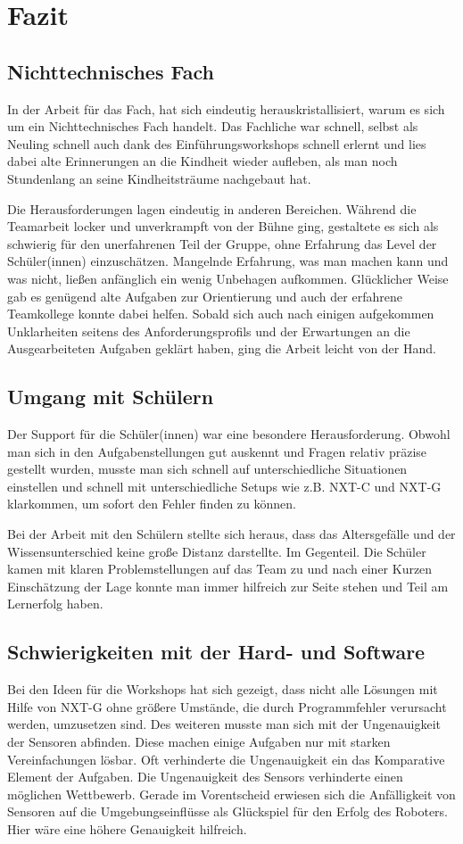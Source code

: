 \chapter{Fazit}
\section{Nichttechnisches Fach}
In der Arbeit für das Fach, hat sich eindeutig herauskristallisiert, warum es sich um ein Nichttechnisches Fach handelt. Das Fachliche war schnell, selbst als Neuling schnell auch dank des Einführungsworkshops schnell erlernt und lies dabei alte Erinnerungen an die Kindheit wieder aufleben, als man noch Stundenlang an seine Kindheitsträume nachgebaut hat.

Die Herausforderungen lagen eindeutig in anderen Bereichen. Während die Teamarbeit locker und unverkrampft von der Bühne ging, gestaltete es sich als schwierig für den unerfahrenen Teil der Gruppe, ohne Erfahrung das Level der Schüler(innen) einzuschätzen. Mangelnde Erfahrung, was man machen kann und was nicht, ließen anfänglich ein wenig Unbehagen aufkommen. Glücklicher Weise gab es genügend alte Aufgaben zur Orientierung und auch der erfahrene Teamkollege konnte dabei helfen. Sobald sich auch nach einigen aufgekommen Unklarheiten seitens des Anforderungsprofils und der Erwartungen an die Ausgearbeiteten Aufgaben geklärt haben, ging die Arbeit leicht von der Hand. 
    
\section{Umgang mit Schülern}
Der Support für die Schüler(innen) war eine besondere Herausforderung. Obwohl man sich in den Aufgabenstellungen gut auskennt und Fragen relativ präzise gestellt wurden, musste man sich schnell auf unterschiedliche Situationen einstellen und schnell mit unterschiedliche Setups wie z.B. NXT-C und NXT-G klarkommen, um sofort den Fehler finden zu können.

Bei der Arbeit mit den Schülern stellte sich heraus, dass das Altersgefälle und der Wissensunterschied keine große Distanz darstellte. Im Gegenteil. Die Schüler kamen mit klaren Problemstellungen auf das Team zu und nach einer Kurzen Einschätzung der Lage konnte man immer hilfreich zur Seite stehen und Teil am Lernerfolg haben.
  
\section{Schwierigkeiten mit der Hard- und Software}
Bei den Ideen für die Workshops hat sich gezeigt, dass nicht alle Lösungen mit Hilfe von NXT-G ohne größere Umstände, die durch Programmfehler verursacht werden, umzusetzen sind. Des weiteren musste man sich mit der Ungenauigkeit der Sensoren abfinden. Diese machen einige Aufgaben nur mit starken Vereinfachungen lösbar. Oft verhinderte die Ungenauigkeit ein das Komparative Element der Aufgaben. Die Ungenauigkeit des Sensors verhinderte einen möglichen Wettbewerb. Gerade im Vorentscheid erwiesen sich die Anfälligkeit von Sensoren auf die Umgebungseinflüsse als Glückspiel für den Erfolg des Roboters. Hier wäre eine höhere Genauigkeit hilfreich.
    
